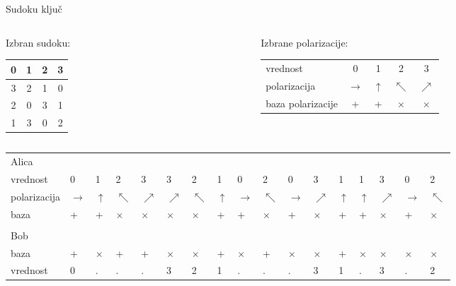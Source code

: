 \documentclass{beamer}
\begin{document}
\begin{frame}{Sudoku ključ}

\begin{columns}

\begin{column}{0.3\textwidth}

Izbran sudoku:\\

\begin{center}
\begin{tabular}{| c | c || c | c |}
\hline
0 & 1 & 2 & 3\\
\hline
3 & 2 & 1 & 0\\
\hline
\hline
2 & 0 & 3 & 1\\
\hline
1 & 3 & 0 & 2\\
\hline
\end{tabular}
\end{center}

\end{column}


\begin{column}{0.7\textwidth}

Izbrane polarizacije: \bigskip

\begin{tabular}{l c c c c}
vrednost & 0 & 1 & 2 & 3\\
polarizacija & $\rightarrow$ & $\uparrow$ & $\nwarrow$ & $\nearrow$\\
baza polarizacije & + & + & $\times$ & $\times$\\
\end{tabular}

\end{column}

\end{columns}

\bigskip

\begin{tabular}{m{1.5cm} m{0.10 cm} m{0.10 cm} m{0.10 cm} m{0.10 cm} m{0.10 cm} m{0.10 cm} m{0.10 cm} m{0.10 cm} m{0.10 cm} m{0.10 cm} m{0.10 cm} m{0.10 cm} m{0.10 cm} m{0.10 cm} m{0.10 cm} m{0.10 cm}}
Alica\\
vrednost & 0 & 1 & 2 & 3 & 3 & 2 & 1 & 0 & 2 & 0 & 3 & 1 & 1 & 3 & 0 & 2\\
polarizacija & $\rightarrow$ & $\uparrow$ & $\nwarrow$ & $\nearrow$ & $\nearrow$ & $\nwarrow$ & $\uparrow$ & $\rightarrow$ & $\nwarrow$ & $\rightarrow$ & $\nearrow$ & $\uparrow$ & $\uparrow$ & $\nearrow$ & $\rightarrow$ & $\nwarrow$\\
baza & + & + & $\times$ & $\times$ & $\times$ & $\times$ & + & + & $\times$ & + & $\times$ & + & + & $\times$ & + & $\times$\\
\\
Bob\\
baza & + & $\times$ & + & + & $\times$ & $\times$ & + & $\times$ & + & $\times$ & $\times$ & + & $\times$ & $\times$ & $\times$ & $\times$\\
vrednost & 0 & . & . & . & 3 & 2 & 1 & . & . & . & 3 & 1 & . & 3 & . & 2\\ 
\end{tabular}

\end{frame}

\end{document}
